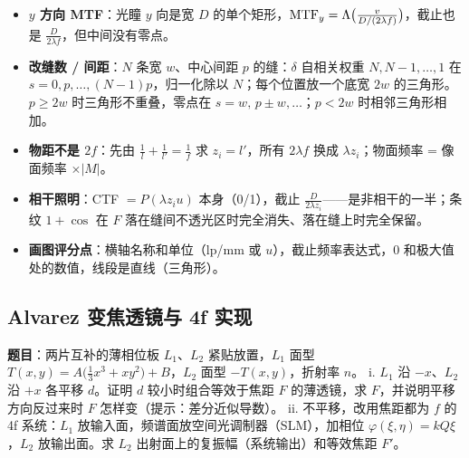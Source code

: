 \begin{warn}[变式]
\begin{itemize}
\item \textbf{$y$ 方向 MTF}：光瞳 $y$ 向是宽 $D$ 的单个矩形，$\mathrm{MTF}_y=\Lambda\big(\frac{v}{D/(2\lambda f)}\big)$，截止也是 $\frac{D}{2\lambda f}$，但中间没有零点。
\item \textbf{改缝数 / 间距}：$N$ 条宽 $w$、中心间距 $p$ 的缝：$\delta$ 自相关权重 $N,N-1,\dots,1$ 在 $s=0,p,\dots,(N-1)p$，归一化除以 $N$；每个位置放一个底宽 $2w$ 的三角形。$p\ge2w$ 时三角形不重叠，零点在 $s=w,\,p\pm w,\dots$；$p<2w$ 时相邻三角形相加。
\item \textbf{物距不是 $2f$}：先由 $\frac1l+\frac1{l'}=\frac1f$ 求 $z_i=l'$，所有 $2\lambda f$ 换成 $\lambda z_i$；物面频率 = 像面频率 $\times|M|$。
\item \textbf{相干照明}：CTF $=P(\lambda z_iu)$ 本身（0/1），截止 $\frac{D}{2\lambda z_i}$——是非相干的一半；条纹 $1+\cos$ 在 $F$ 落在缝间不透光区时完全消失、落在缝上时完全保留。
\item \textbf{画图评分点}：横轴名称和单位（lp/mm 或 $u$），截止频率表达式，0 和极大值处的数值，线段是直线（三角形）。
\end{itemize}
\end{warn}

\subsection{Alvarez 变焦透镜与 4f 实现}\label{ex:v-alvarez}
\noindent\textbf{题目}：两片互补的薄相位板 $L_1$、$L_2$ 紧贴放置，$L_1$ 面型 $T(x,y)=A\big(\frac13x^3+xy^2\big)+B$，$L_2$ 面型 $-T(x,y)$，折射率 $n$。
i. $L_1$ 沿 $-x$、$L_2$ 沿 $+x$ 各平移 $d$。证明 $d$ 较小时组合等效于焦距 $F$ 的薄透镜，求 $F$，并说明平移方向反过来时 $F$ 怎样变（提示：差分近似导数）。
ii. 不平移，改用焦距都为 $f$ 的 4f 系统：$L_1$ 放输入面，频谱面放空间光调制器（SLM），加相位 $\varphi(\xi,\eta)=kQ\xi$，$L_2$ 放输出面。求 $L_2$ 出射面上的复振幅（系统输出）和等效焦距 $F'$。

